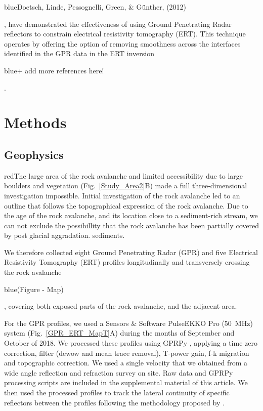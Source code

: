 \documentclass[5p]{elsarticle}
\newcommand{\COMON}{\begin{color}{blue}}
\newcommand{\COMOFF}{\end{color}}
\newcommand{\alon}{\begin{color}{red}}
\newcommand{\aloff}{\end{color}}
\begin{document}
\COMON Doetsch, Linde, Pessognelli, Green, \& Günther, (2012)\COMOFF, have demonstrated the effectiveness of using Ground Penetrating Radar reflectors to constrain electrical resistivity tomography (ERT). This technique operates by offering the option of removing smoothness across the interfaces identified in the GPR data in the ERT inversion \COMON + add more references here! \COMOFF.  



\bigskip   



\section{Methods}

\subsection{Geophysics}

\alon The large area of the rock avalanche and limited accessibility
due to large boulders and vegetation (Fig.~\ref{Study_Area2}B) made a
full three-dimensional investigation impossible. Initial investigation
of the rock avalanche led to an outline that follows the topographical
expression of the rock avalanche. Due to the age of the rock
avalanche, and its location close to a sediment-rich stream, we can
not exclude the possibillity that the rock avalanche has been partially covered by post glacial aggradation. 
sediments. \aloff We therefore collected eight Ground Penetrating Radar
(GPR) and five Electrical Resistivity Tomography (ERT) profiles
longitudinally and transversely crossing the rock avalanche
\COMON(Figure - Map)\COMOFF, covering both exposed parts of the rock
avalanche, and the adjacent area.



For the GPR profiles, we used a Sensors \& Software PulseEKKO Pro (\SI{50}{\mega Hz}) system (Fig.~\ref{GPR_ERT_MapT}A) during the
months of September and October of 2018. We processed these profiles using GPRPy
\citep{plattner2019comunity,Plattner2019}, applying a time zero
correction, filter (dewow and mean trace removal), T-power gain, f-k
migration \citep{stolt1978migration} and topographic correction. We used a single velocity that we obtained from a wide angle
reflection and refraction survey on site. Raw data and GPRPy
processing scripts are included in the supplemental material of this
article. We then used the processed profiles to track the lateral continuity of specific reflectors between the profiles following the methodology proposed by
\citep{mitchum1977seismic}.
\end{document}
